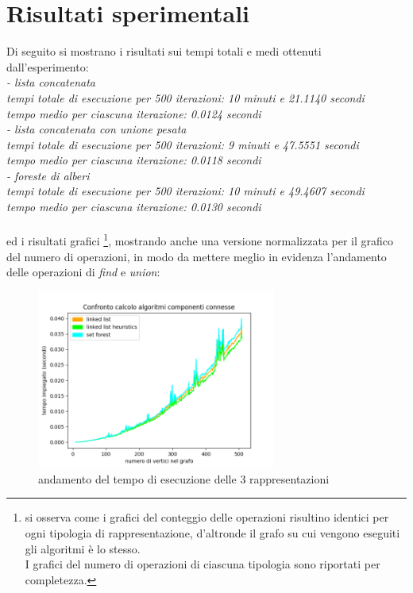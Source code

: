 \documentclass[12pt]{article}
\begin{document}
\section{Risultati sperimentali}
Di seguito si mostrano i risultati sui tempi totali e medi ottenuti dall'esperimento:\\
\textit{- lista concatenata\\
tempi totale di esecuzione per  500  iterazioni:  10  minuti e  21.1140  secondi \\
tempo medio per ciascuna iterazione:  0.0124 secondi\\
- lista concatenata con unione pesata\\
tempi totale di esecuzione per  500  iterazioni:  9  minuti e  47.5551  secondi \\
tempo medio per ciascuna iterazione:  0.0118 secondi\\
- foreste di alberi\\
tempi totale di esecuzione per  500  iterazioni:  10  minuti e  49.4607  secondi \\
tempo medio per ciascuna iterazione:  0.0130 secondi\\
}\\
ed i risultati grafici \footnote{si osserva come i grafici del conteggio delle operazioni risultino identici per ogni tipologia di rappresentazione, d'altronde il grafo su cui vengono eseguiti gli algoritmi è lo stesso.\\
I grafici del numero di operazioni di ciascuna tipologia sono riportati per completezza.}, mostrando anche una versione normalizzata per il grafico del numero di operazioni, in modo da mettere meglio in evidenza l'andamento delle operazioni di \textit{find} e \textit{union}:

    \begin{figure}[h]
        \centering
        \includegraphics[width=0.7\textwidth]{images/results/result.png}
        \caption{andamento del tempo di esecuzione delle 3 rappresentazioni}
        \label{fig:result}
    \end{figure}
\end{document}
